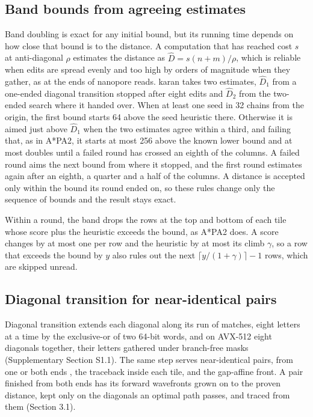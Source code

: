\subsection{Band bounds from agreeing estimates}

Band doubling is exact for any initial bound, but its running time depends on how close that bound is to the distance. A computation that has reached cost \(s\) at anti-diagonal \(\rho\) estimates the distance as \(\hat D = s(n+m)/\rho\), which is reliable when edits are spread evenly and too high by orders of magnitude when they gather, as at the ends of nanopore reads. karan takes two estimates, \(\hat D_1\) from a one-ended diagonal transition stopped after eight edits and \(\hat D_2\) from the two-ended search where it handed over. When at least one seed in 32 chains from the origin, the first bound starts 64 above the seed heuristic there. Otherwise it is aimed just above \(\hat D_1\) when the two estimates agree within a third, and failing that, as in A*PA2, it starts at most 256 above the known lower bound and at most doubles until a failed round has crossed an eighth of the columns. A failed round aims the next bound from where it stopped, and the first round estimates again after an eighth, a quarter and a half of the columns. A distance is accepted only within the bound its round ended on, so these rules change only the sequence of bounds and the result stays exact.

Within a round, the band drops the rows at the top and bottom of each tile whose score plus the heuristic exceeds the bound, as A*PA2 does. A score changes by at most one per row and the heuristic by at most its climb \(\gamma\), so a row that exceeds the bound by \(y\) also rules out the next \(\lceil y/(1+\gamma) \rceil - 1\) rows, which are skipped unread.

\subsection{Diagonal transition for near-identical pairs}

Diagonal transition extends each diagonal along its run of matches, eight letters at a time by the exclusive-or of two 64-bit words, and on AVX-512 eight diagonals together, their letters gathered under branch-free masks (Supplementary Section S1.1). The same step serves near-identical pairs, from one or both ends \citep{MarcoSola2023biwfa}, the traceback inside each tile, and the gap-affine front. A pair finished from both ends has its forward wavefronts grown on to the proven distance, kept only on the diagonals an optimal path passes, and traced from them (Section 3.1).

